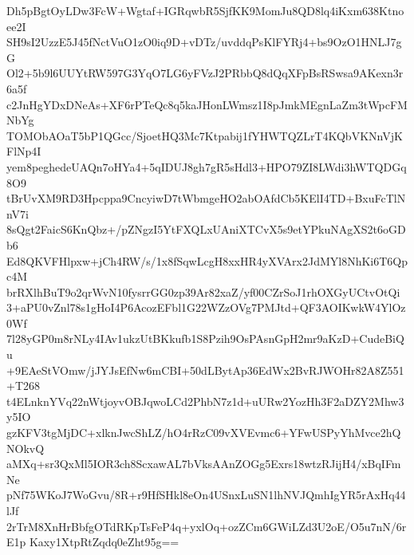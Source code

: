 Dh5pBgtOyLDw3FcW+Wgtaf+IGRqwbR5SjfKK9MomJu8QD8lq4iKxm638Ktnoee2I
SH9sI2UzzE5J45fNctVuO1zO0iq9D+vDTz/uvddqPsKlFYRj4+bs9OzO1HNLJ7gG
Ol2+5b9l6UUYtRW597G3YqO7LG6yFVzJ2PRbbQ8dQqXFpBsRSwsa9AKexn3r6a5f
c2JnHgYDxDNeAs+XF6rPTeQc8q5kaJHonLWmsz1I8pJmkMEgnLaZm3tWpcFMNbYg
TOMObAOaT5bP1QGcc/SjoetHQ3Mc7Ktpabij1fYHWTQZLrT4KQbVKNnVjKFlNp4I
yem8peghedeUAQn7oHYa4+5qIDUJ8gh7gR5sHdl3+HPO79ZI8LWdi3hWTQDGq8O9
tBrUvXM9RD3Hpcppa9CncyiwD7tWbmgeHO2abOAfdCb5KElI4TD+BxuFcTlNnV7i
8sQgt2FaicS6KnQbz+/pZNgzI5YtFXQLxUAniXTCvX5s9etYPkuNAgXS2t6oGDb6
Ed8QKVFHlpxw+jCh4RW/s/1x8fSqwLcgH8xxHR4yXVArx2JdMYl8NhKi6T6Qpc4M
brRXlhBuT9o2qrWvN10fysrrGG0zp39Ar82xaZ/yf00CZrSoJ1rhOXGyUCtvOtQi
3+aPU0vZnl78s1gHoI4P6AcozEFbl1G22WZzOVg7PMJtd+QF3AOIKwkW4YlOz0Wf
7l28yGP0m8rNLy4IAv1ukzUtBKkufb1S8Pzih9OsPAsnGpH2mr9aKzD+CudeBiQu
+9EAeStVOmw/jJYJsEfNw6mCBI+50dLBytAp36EdWx2BvRJWOHr82A8Z551+T268
t4ELnknYVq22nWtjoyvOBJqwoLCd2PhbN7z1d+uURw2YozHh3F2aDZY2Mhw3y5IO
gzKFV3tgMjDC+xlknJwcShLZ/hO4rRzC09vXVEvmc6+YFwUSPyYhMvce2hQNOkvQ
aMXq+sr3QxMl5IOR3ch8ScxawAL7bVksAAnZOGg5Exrs18wtzRJijH4/xBqIFmNe
pNf75WKoJ7WoGvu/8R+r9HfSHkl8eOn4USnxLuSN1lhNVJQmhIgYR5rAxHq44lJf
2rTrM8XnHrBbfgOTdRKpTsFeP4q+yxlOq+ozZCm6GWiLZd3U2oE/O5u7nN/6rE1p
Kaxy1XtpRtZqdq0eZht95g==
